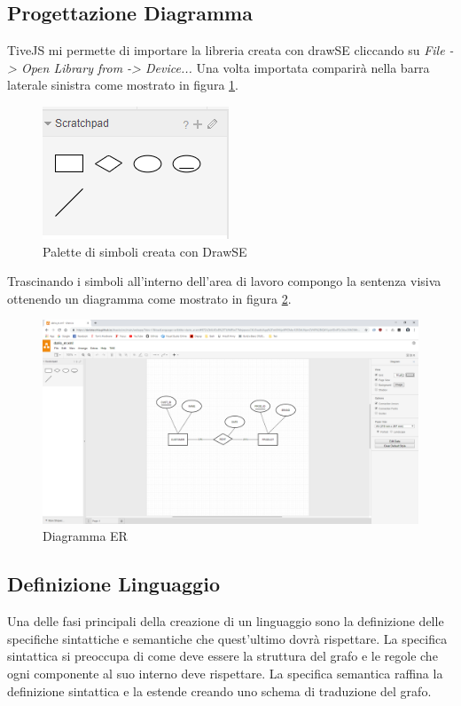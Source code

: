         \subsection{Progettazione Diagramma}
            TiveJS mi permette di importare la libreria creata con drawSE cliccando su \textit{File -> Open Library from -> Device...} Una volta importata comparirà nella barra laterale sinistra come mostrato in figura \ref{fig:library}.
            \begin{figure}[htbp]
                \centering
                \includegraphics[scale=0.5]{Figure/drawse/library.PNG}
                \caption{Palette di simboli creata con DrawSE}
                \label{fig:library}
            \end{figure}
            Trascinando i simboli all'interno dell'area di lavoro compongo la sentenza visiva ottenendo un diagramma come mostrato in figura \ref{fig:sentence}.
            \begin{figure}[htbp]
                \centering
                \includegraphics[scale=0.2]{Figure/drawse/sentence.PNG}
                \caption{Diagramma ER}
                \label{fig:sentence}
            \end{figure}

        \subsection{Definizione Linguaggio}
            Una delle fasi principali della creazione di un linguaggio sono la definizione delle specifiche sintattiche e semantiche che quest'ultimo dovrà rispettare.
            \newline
            La specifica sintattica si preoccupa di come deve essere la struttura del grafo e le regole che ogni componente al suo interno deve rispettare. La specifica semantica raffina la definizione sintattica e la estende creando uno schema di traduzione del grafo.


